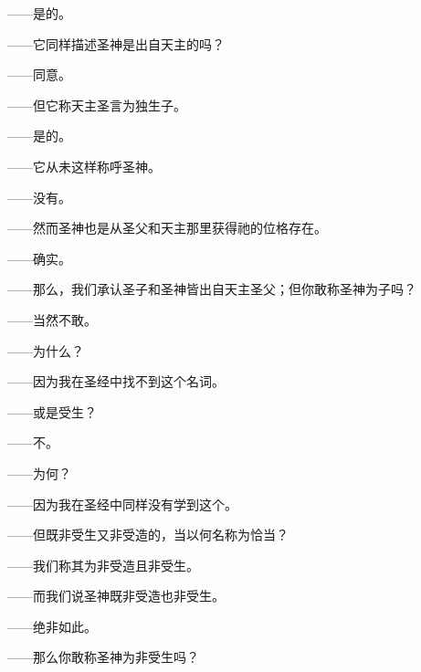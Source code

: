 ——是的。\par

——它同样描述圣神是出自天主的吗？\par

——同意。\par

——但它称天主圣言为独生子。\par

——是的。\par

——它从未这样称呼圣神。\par

——没有。\par

——然而圣神也是从圣父和天主那里获得祂的位格存在。\par

——确实。\par

——那么，我们承认圣子和圣神皆出自天主圣父；但你敢称圣神为子吗？\par

——当然不敢。\par

——为什么？\par

——因为我在圣经中找不到这个名词。\par

——或是受生？\par

——不。\par

——为何？\par

——因为我在圣经中同样没有学到这个。\par

——但既非受生又非受造的，当以何名称为恰当？\par

——我们称其为非受造且非受生。\par

——而我们说圣神既非受造也非受生。\par

——绝非如此。\par

——那么你敢称圣神为非受生吗？\par

